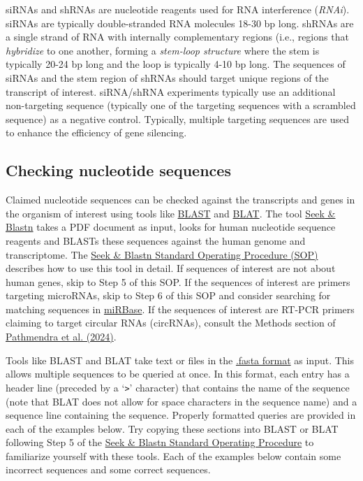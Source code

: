 \documentclass[letterpaper, 12pt]{article}
\begin{document}
siRNAs and shRNAs are nucleotide reagents used for RNA interference (\emph{RNAi}). siRNAs are typically double-stranded RNA molecules 18-30 bp long. shRNAs are a single strand of RNA with internally complementary regions (i.e., regions that \emph{hybridize} to one another, forming a \emph{stem-loop structure} where the stem is typically 20-24 bp long and the loop is typically 4-10 bp long. The sequences of siRNAs and the stem region of shRNAs should target unique regions of the transcript of interest. siRNA/shRNA experiments typically use an additional non-targeting sequence (typically one of the targeting sequences with a scrambled sequence) as a negative control. Typically, multiple targeting sequences are used to enhance the efficiency of gene silencing.

\subsection*{Checking nucleotide sequences}

Claimed nucleotide sequences can be checked against the transcripts and genes in the organism of interest using tools like \href{https://blast.ncbi.nlm.nih.gov/Blast.cgi?PROGRAM=blastn}{BLAST} and \href{https://genome.ucsc.edu/cgi-bin/hgBlat}{BLAT}. The tool \href{https://scigendetection.imag.fr/TPD52/Vb/}{Seek \& Blastn} takes a PDF document as input, looks for human nucleotide sequence reagents and BLASTs these sequences against the human genome and transcriptome. The \href{https://dx.doi.org/10.17504/protocols.io.bjhpkj5n}{Seek \& Blastn Standard Operating Procedure (SOP)} describes how to use this tool in detail. If sequences of interest are not about human genes, skip to Step 5 of this SOP. If the sequences of interest are primers targeting microRNAs, skip to Step 6 of this SOP and consider searching for matching sequences in \href{https://www.mirbase.org/}{miRBase}. If the sequences of interest are RT-PCR primers claiming to target circular RNAs (circRNAs), consult the Methods section of \href{https://doi.org/10.1007/s00210-023-02846-2}{Pathmendra et al. (2024)}.

Tools like BLAST and BLAT take text or files in the \href{https://en.wikipedia.org/wiki/FASTA_format}{.fasta format} as input. This allows multiple sequences to be queried at once. In this format, each entry has a header line (preceded by a `\verb|>|' character) that contains the name of the sequence (note that BLAT does not allow for space characters in the sequence name) and a sequence line containing the sequence. Properly formatted queries are provided in each of the examples below. Try copying these sections into BLAST or BLAT following Step 5 of the \href{https://dx.doi.org/10.17504/protocols.io.bjhpkj5n}{Seek \& Blastn Standard Operating Procedure} to familiarize yourself with these tools. Each of the examples below contain some incorrect sequences and some correct sequences.
\end{document}
